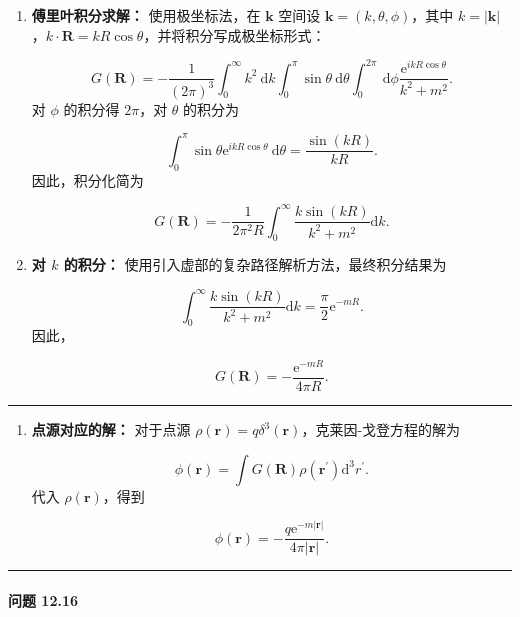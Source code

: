 \begin{enumerate}
\def\labelenumi{\arabic{enumi}.}
\item
  \textbf{傅里叶积分求解：} 使用极坐标法，在 $\mathbf{k}$ 空间设
  $\mathbf{k}=(k, \theta, \phi)$，其中
  $k=|\mathbf{k}|$，$k \cdot \mathbf{R}=k R \cos\theta$，并将积分写成极坐标形式：

  $$
  G(\mathbf{R})=-\frac{1}{(2 \pi)^{3}} \int_{0}^{\infty} k^{2} \mathrm{~d} k \int_{0}^{\pi} \sin \theta \mathrm{~d} \theta \int_{0}^{2 \pi} \mathrm{~d} \phi \frac{\mathrm{e}^{i k R \cos \theta}}{k^{2}+m^{2}}.
  $$
  对 $\phi$ 的积分得 $2 \pi$，对 $\theta$ 的积分为

  $$
  \int_{0}^{\pi} \sin \theta \mathrm{e}^{i k R \cos \theta} \mathrm{~d} \theta = \frac{\sin(k R)}{k R}.
  $$
  因此，积分化简为

  $$
  G(\mathbf{R})=-\frac{1}{2 \pi^{2} R} \int_{0}^{\infty} \frac{k \sin(k R)}{k^{2}+m^{2}} \mathrm{d} k.
  $$
\item
  \textbf{对 $k$ 的积分：}
  使用引入虚部的复杂路径解析方法，最终积分结果为

  $$
  \int_{0}^{\infty} \frac{k \sin(k R)}{k^{2}+m^{2}} \mathrm{d} k = \frac{\pi}{2} \mathrm{e}^{-m R}.
  $$
  因此，

  $$
  G(\mathbf{R})=-\frac{\mathrm{e}^{-m R}}{4 \pi R}.
  $$
\end{enumerate}

\begin{center}\rule{0.5\linewidth}{0.5pt}\end{center}

\begin{enumerate}
\def\labelenumi{\arabic{enumi}.}
\setcounter{enumi}{2}
\item
  \textbf{点源对应的解：} 对于点源
  $\rho(\mathbf{r})=q \delta^{3}(\mathbf{r})$，克莱因-戈登方程的解为

  $$
  \phi(\mathbf{r}) = \int G(\mathbf{R}) \rho(\mathbf{r}^{\prime}) \mathrm{d}^{3} r^{\prime}.
  $$
  代入 $\rho(\mathbf{r})$，得到

  $$
  \phi(\mathbf{r}) = -\frac{q \mathrm{e}^{-m |\mathbf{r}|}}{4 \pi |\mathbf{r}|}.
  $$
\end{enumerate}

\begin{center}\rule{0.5\linewidth}{0.5pt}\end{center}

\paragraph{问题 12.16}\label{ux95eeux9898-12.16}

